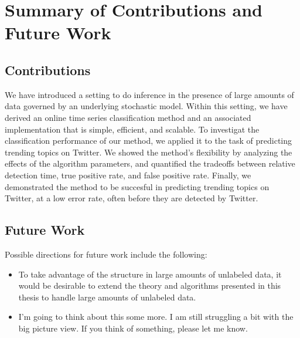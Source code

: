 \chapter{Summary of Contributions and Future Work}
\label{ch:conclusion}

\section{Contributions}
We have introduced a setting to do inference in the presence of large amounts of
data governed by an underlying stochastic model. Within this setting, we have
derived an online time series classification method and an associated
implementation that is simple, efficient, and scalable. To investigat the
classification performance of our method, we applied it to the task of
predicting trending topics on Twitter. We showed the method's flexibility by
analyzing the effects of the algorithm parameters, and quantified the tradeoffs
between relative detection time, true positive rate, and false positive
rate. Finally, we demonstrated the method to be succesful in predicting trending
topics on Twitter, at a low error rate, often before they are detected by
Twitter.

\section{Future Work}
Possible directions for future work include the following:

\begin{itemize}
\item To take advantage of the structure in large amounts of unlabeled data, it
  would be desirable to extend the theory and algorithms presented in this
  thesis to handle large amounts of unlabeled data.
\item I'm going to think about this some more. I am still struggling a bit with
  the big picture view. If you think of something, please let me know.
\end{itemize}


